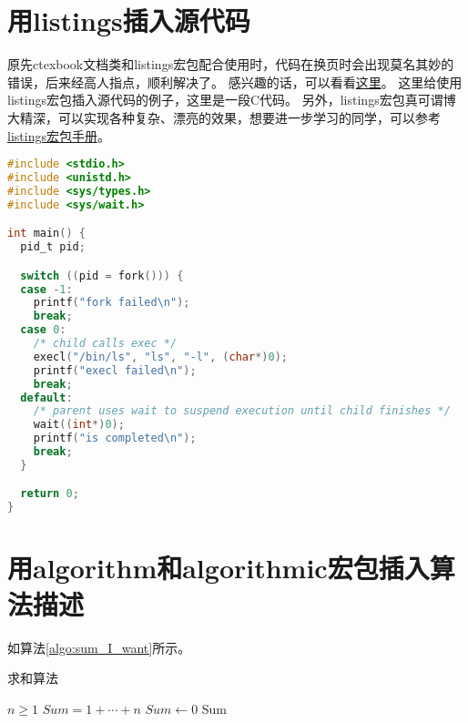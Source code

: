 \section{用listings插入源代码}

原先ctexbook文档类和listings宏包配合使用时，代码在换页时会出现莫名其妙的错误，后来经高人指点，顺利解决了。
感兴趣的话，可以看看\href{http://bbs.ctex.org/viewthread.php?tid=53451}{这里}。
这里给使用listings宏包插入源代码的例子，这里是一段C代码。
另外，listings宏包真可谓博大精深，可以实现各种复杂、漂亮的效果，想要进一步学习的同学，可以参考
\href{http://mirror.ctan.org/macros/latex/contrib/listings/listings.pdf}{listings宏包手册}。

\begin{lstlisting}[language={C}, caption={一段C源代码}]
#include <stdio.h>
#include <unistd.h>
#include <sys/types.h>
#include <sys/wait.h>

int main() {
  pid_t pid;

  switch ((pid = fork())) {
  case -1:
    printf("fork failed\n");
    break;
  case 0:
    /* child calls exec */
    execl("/bin/ls", "ls", "-l", (char*)0);
    printf("execl failed\n");
    break;
  default:
    /* parent uses wait to suspend execution until child finishes */
    wait((int*)0);
    printf("is completed\n");
    break;
  }

  return 0;
}
\end{lstlisting}

\section{用algorithm和algorithmic宏包插入算法描述}

如算法\ref{algo:sum_I_want}所示。

\begin{algorithm}
\caption{求和算法}
\label{algo:sum_I_want}
\begin{algorithmic}
\REQUIRE $n \geq 1$                  %
\ENSURE $Sum = 1 + \cdots + n$       %
\STATE $Sum \leftarrow 0$            %
\ENDIF
\RETURN Sum
\end{algorithmic}
\end{algorithm}

